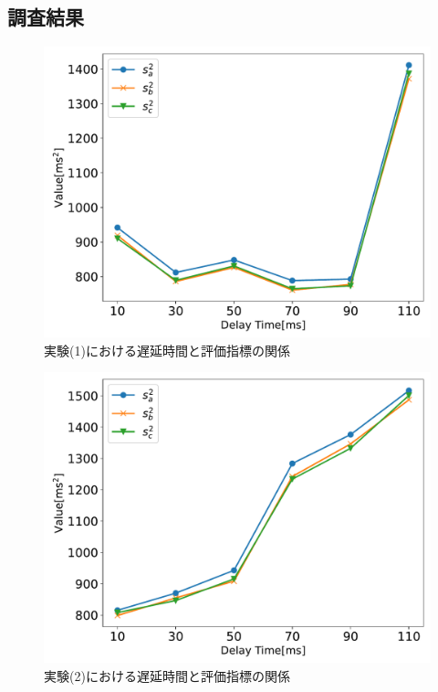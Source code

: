 \subsection{調査結果}
\begin{figure}[tbp]
  \centering
  \includegraphics[scale=0.5]{figures/Yobi/Var/Var-Normal.pdf}
  \caption{実験(1)における遅延時間と評価指標の関係}
  \label{fig:Normal_bunsan}
\end{figure}
\begin{figure}[bt]
  \centering
  \includegraphics[scale=0.5]{figures/Yobi/Var/Var-Yobi-Unique.pdf}
  \caption{実験(2)における遅延時間と評価指標の関係}
  \label{fig:Unique_bunsan}
\end{figure}

